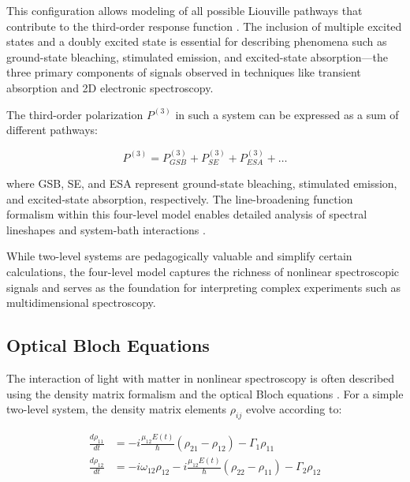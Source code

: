 \noindent This configuration allows modeling of all possible Liouville pathways that contribute to the third-order response function \cite{mukamel1995principlesnonlinearoptical}. The inclusion of multiple excited states and a doubly excited state is essential for describing phenomena such as ground-state bleaching, stimulated emission, and excited-state absorption—the three primary components of signals observed in techniques like transient absorption and 2D electronic spectroscopy.

\noindent The third-order polarization $P^{(3)}$ in such a system can be expressed as a sum of different pathways:

\begin{equation}
	P^{(3)} = P^{(3)}_{GSB} + P^{(3)}_{SE} + P^{(3)}_{ESA} + \ldots
	\label{eq:third_order_contributions}
\end{equation}

\noindent where GSB, SE, and ESA represent ground-state bleaching, stimulated emission, and excited-state absorption, respectively. The line-broadening function formalism within this four-level model enables detailed analysis of spectral lineshapes and system-bath interactions \cite{cho2009twodimensionalopticalspectroscopy, abramaviciusetal2009coherentmultidimensionaloptical}.

\noindent While two-level systems are pedagogically valuable and simplify certain calculations, the four-level model captures the richness of nonlinear spectroscopic signals and serves as the foundation for interpreting complex experiments such as multidimensional spectroscopy.

\subsection{Optical Bloch Equations}
\label{subsec:optical_bloch}

\noindent The interaction of light with matter in nonlinear spectroscopy is often described using the density matrix formalism and the optical Bloch equations \cite{tanimuramukamel1993twodimensionalfemtosecondvibrational}. For a simple two-level system, the density matrix elements $\rho_{ij}$ evolve according to:

\begin{align}
	\frac{d\rho_{11}}{dt} & = -i\frac{\mu_{12}E(t)}{\hbar}(\rho_{21} - \rho_{12}) - \Gamma_1 \rho_{11} \label{eq:bloch_population}                        \\
	\frac{d\rho_{12}}{dt} & = -i\omega_{12}\rho_{12} - i\frac{\mu_{12}E(t)}{\hbar}(\rho_{22} - \rho_{11}) - \Gamma_2 \rho_{12} \label{eq:bloch_coherence}
\end{align}

